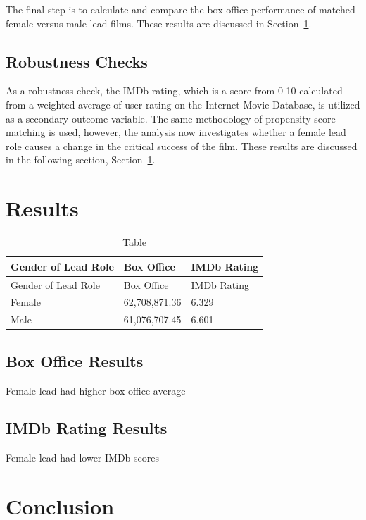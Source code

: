 \documentclass[
]{agujournal2019}
\begin{document}
The final step is to calculate and compare the box office performance of
matched female versus male lead films. These results are discussed in
Section~\ref{sec-results}.

\subsection{Robustness Checks}\label{robustness-checks}

As a robustness check, the IMDb rating, which is a score from 0-10
calculated from a weighted average of user rating on the Internet Movie
Database, is utilized as a secondary outcome variable. The same
methodology of propensity score matching is used, however, the analysis
now investigates whether a female lead role causes a change in the
critical success of the film. These results are discussed in the
following section, Section~\ref{sec-results}.

\section{Results}\label{sec-results}

\begin{longtable}[]{@{}lll@{}}
\caption{Table}\label{tbl-2}\tabularnewline
\toprule\noalign{}
Gender of Lead Role & Box Office & IMDb Rating \\
\midrule\noalign{}
\endfirsthead
\toprule\noalign{}
Gender of Lead Role & Box Office & IMDb Rating \\
\midrule\noalign{}
\endhead
\bottomrule\noalign{}
\endlastfoot
Female & 62,708,871.36 & 6.329 \\
Male & 61,076,707.45 & 6.601 \\
\end{longtable}

\subsection{Box Office Results}\label{box-office-results}

Female-lead had higher box-office average

\subsection{IMDb Rating Results}\label{imdb-rating-results}

Female-lead had lower IMDb scores

\section{Conclusion}\label{sec-conclusion}
\end{document}
